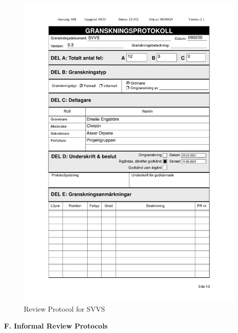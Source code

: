 \documentclass{article}
\begin{document}
   \begin{figure}
     \centering
     \includegraphics[width=13cm]{images/SVVS - Granskningsprotokoll-1}
     \renewcommand\figurename{Figure}
     \caption{Review Protocol for SVVS}
     \label{fig:my_label}
 \end{figure}
 
 
 \newpage
\begin{flushleft}
{\large \textbf{F. Informal Review Protocols}}
\end{flushleft}
\end{document}
